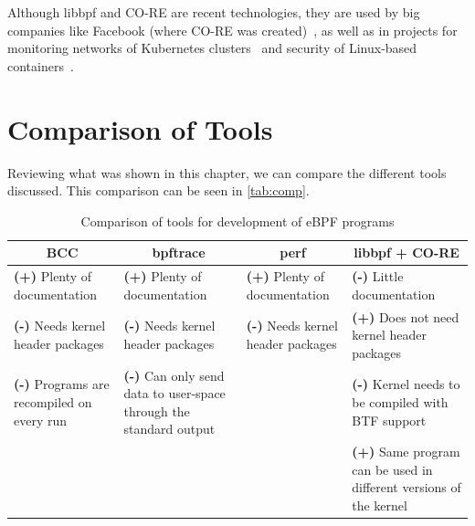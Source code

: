 Although libbpf and \ac{CO-RE} are recent technologies, they are used by big
companies like Facebook (where \ac{CO-RE} was created)~\cite{fbslide}, as well
as in projects for monitoring networks of Kubernetes clusters~\cite{kuber} and
security of Linux-based containers~\cite{sec}.


\section{Comparison of Tools}

Reviewing what was shown in this chapter, we can compare the different tools
discussed. This comparison can be seen in \autoref{tab:comp}.

\begin{table}[htb]
   \centering
   \begin{tabular}{|p{3.5cm}|p{3.5cm}|p{3.5cm}|p{3.5cm}|}
      \hline
      \multicolumn{1}{|c|}{\textbf{BCC}} &
        \multicolumn{1}{c|}{\textbf{bpftrace}} &
        \multicolumn{1}{c|}{\textbf{perf}} & \multicolumn{1}{c|}{\textbf{libbpf
        + CO-RE}} \\
      \hline
      \textbf{(+)} Plenty of \newline documentation & \textbf{(+)} Plenty of
        \newline documentation & \textbf{(+)} Plenty of \newline documentation &
        \textbf{(-)} Little \newline documentation \\
      \hline
      \textbf{(-)} Needs kernel \newline header packages & \textbf{(-)} Needs
        kernel \newline header packages & \textbf{(-)} Needs kernel \newline
        header packages & \textbf{(+)} Does not need \newline kernel header
        \newline packages \\
      \hline
      \textbf{(-)} Programs are \newline recompiled on every run & \textbf{(-)}
        Can only send data to user-space through the standard output & &
        \textbf{(-)} Kernel needs to be compiled with BTF support \\
      \hline
      & & & \textbf{(+)} Same program can be used in \newline different versions
        of the kernel \\
      \hline
   \end{tabular}
   \caption{Comparison of tools for development of eBPF programs}\label{tab:comp}
\end{table}
